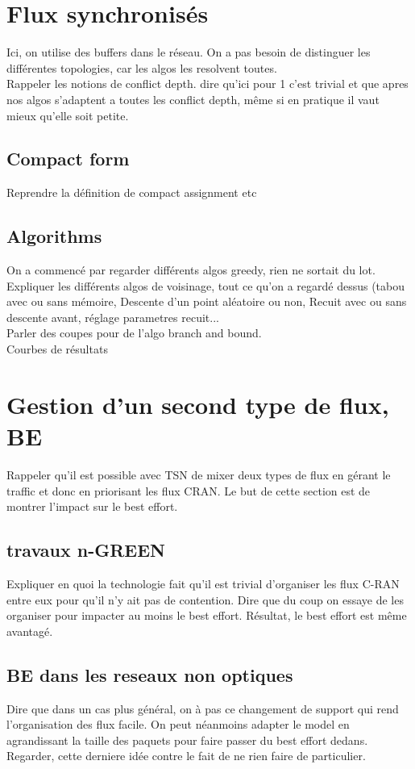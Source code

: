 \documentclass[a4paper,10pt]{article}
\begin{document}
\section{Flux synchronisés}
Ici, on utilise des buffers dans le réseau. On a pas besoin de distinguer les différentes topologies, car les algos les resolvent toutes. \\
Rappeler les notions de conflict depth. dire qu'ici pour 1 c'est trivial et que apres nos algos s'adaptent a toutes les conflict depth, même si en pratique il vaut mieux qu'elle soit petite.
\subsection{Compact form}
Reprendre la définition de compact assignment etc
\subsection{Algorithms}
On a commencé par regarder différents algos greedy, rien ne sortait du lot.
Expliquer les différents algos de voisinage, tout ce qu'on a regardé dessus (tabou avec ou sans mémoire, Descente d'un point aléatoire ou non, Recuit avec ou sans descente avant, réglage parametres recuit...\\
Parler des coupes pour de l'algo branch and bound.\\
Courbes de résultats
\section{Gestion d'un second type de flux, BE}
Rappeler qu'il est possible avec TSN de mixer deux types de flux en gérant le traffic et donc en priorisant les flux CRAN. Le but de cette section est de montrer l'impact sur le best effort.
\subsection{travaux n-GREEN}
Expliquer en quoi la technologie fait qu'il est trivial d'organiser les flux C-RAN entre eux pour qu'il n'y ait pas de contention. 
Dire que du coup on essaye de les organiser pour impacter au moins le best effort. Résultat, le best effort est même avantagé.
\subsection{BE dans les reseaux non optiques}
Dire que dans un cas plus général, on à pas ce changement de support qui rend l'organisation des flux facile. On peut néanmoins adapter le model en agrandissant la taille des paquets pour faire passer du best effort dedans. Regarder, cette derniere idée contre le fait de ne rien faire de particulier.
\end{document}
